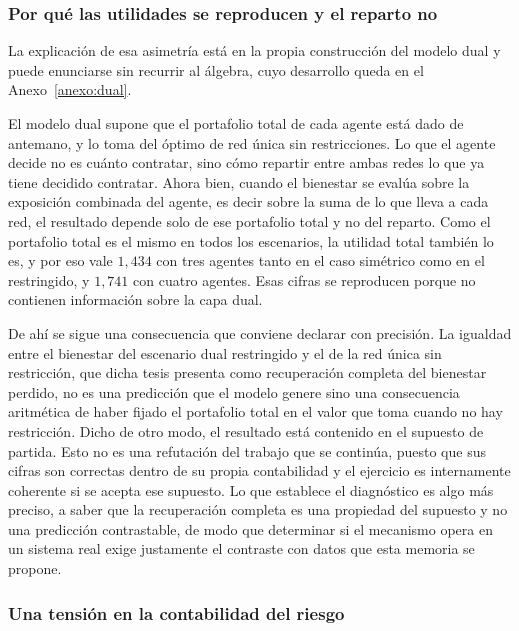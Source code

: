 \subsubsection{Por qué las utilidades se reproducen y el reparto no}
\label{c4:venegas-dual-causa}

La explicación de esa asimetría está en la propia construcción del modelo dual y
puede enunciarse sin recurrir al álgebra, cuyo desarrollo queda en el
Anexo~\ref{anexo:dual}.

El modelo dual supone que el portafolio total de cada agente está dado de
antemano, y lo toma del óptimo de red única sin restricciones. Lo que el agente
decide no es cuánto contratar, sino cómo repartir entre ambas redes lo que ya
tiene decidido contratar. Ahora bien, cuando el bienestar se evalúa sobre la
exposición combinada del agente, es decir sobre la suma de lo que lleva a cada
red, el resultado depende solo de ese portafolio total y no del reparto. Como el
portafolio total es el mismo en todos los escenarios, la utilidad total también
lo es, y por eso vale $1,434$ con tres agentes tanto en el caso simétrico como en
el restringido, y $1,741$ con cuatro agentes. Esas cifras se reproducen porque no
contienen información sobre la capa dual.

De ahí se sigue una consecuencia que conviene declarar con precisión. La
igualdad entre el bienestar del escenario dual restringido y el de la red única
sin restricción, que dicha tesis presenta como recuperación completa del
bienestar perdido, no es una predicción que el modelo genere sino una
consecuencia aritmética de haber fijado el portafolio total en el valor que toma
cuando no hay restricción. Dicho de otro modo, el resultado está contenido en el
supuesto de partida. Esto no es una refutación del trabajo que se continúa,
puesto que sus cifras son correctas dentro de su propia contabilidad y el
ejercicio es internamente coherente si se acepta ese supuesto. Lo que establece
el diagnóstico es algo más preciso, a saber que la recuperación completa es una
propiedad del supuesto y no una predicción contrastable, de modo que determinar
si el mecanismo opera en un sistema real exige justamente el contraste con datos
que esta memoria se propone.

\subsubsection{Una tensión en la contabilidad del riesgo}
\label{c4:venegas-dual-tension}

